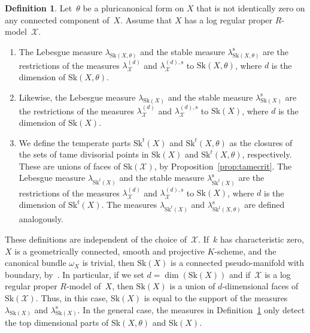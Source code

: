 \documentclass[11pt]{article}
\theoremstyle{definition}
\newtheorem{definition}[equation]{Definition}
\numberwithin{equation}{subsection}
\newcommand{\cX}{\ensuremath{\mathscr{X}}}
\newcommand{\Sk}{\mathrm{Sk}}
\newcommand{\rs}{\mathrm{s}}
\let\form\theta
\let\Leb\lambda
\begin{document}
\begin{definition}\label{defi:skmeasures}
Let~$\form$ be a pluricanonical form on $X$ that is not identically zero on any connected component of~$X$.
Assume that $X$ has a log regular proper $R$\nobreakdash-model~$\cX$.

\begin{enumerate}
\item The Lebesgue measure $\Leb_{\Sk(X,\form)}$ and the stable measure $\Leb^{\rs}_{\Sk(X,\form)}$ are
the restrictions of the measures $\Leb_{\cX}^{(d)}$ and $\Leb^{(d),\rs}_{\cX}$ to $\Sk(X,\form)$, where $d$ is the dimension of $\Sk(X,\form)$.

\item
Likewise, the Lebesgue measure $\Leb_{\Sk(X)}$ and the stable measure $\Leb^{\rs}_{\Sk(X)}$ are
the restrictions of the measures $\Leb_{\cX}^{(d)}$ and $\Leb^{(d),\rs}_{\cX}$ to $\Sk(X)$, where $d$ is the dimension of $\Sk(X)$.

\item We define the temperate parts $\Sk^t(X)$ and $\Sk^t(X,\form)$ as the closures of the sets of tame divisorial points in $\Sk(X)$ and $\Sk^t(X,\form)$, respectively. These are unions of faces of $\Sk(\cX)$, by Proposition~\ref{prop:tamecrit}.
The Lebesgue measure $\Leb_{\Sk^t(X)}$ and the stable measure $\Leb^{\rs}_{\Sk^t(X)}$ are
the restrictions of the measures $\Leb_{\cX}^{(d)}$ and $\Leb^{(d),\rs}_{\cX}$ to $\Sk(X)$, where $d$ is the dimension of $\Sk^t(X)$. The measures $\Leb_{\Sk^t(X)}$ and $\Leb^{\rs}_{\Sk^t(X,\form)}$ are defined analogously.
\end{enumerate}
\end{definition}
These definitions are independent of the choice of~$\cX$.
If~$k$ has characteristic zero, $X$ is a geometrically connected, smooth and projective $K$\nobreakdash-scheme, and the canonical bundle
$\omega_X$ is trivial, then $\Sk(X)$ is a connected pseudo-manifold with boundary, by~\cite[4.2.4]{NiXu}. In particular, if we set $d=\dim(\Sk(X))$ and if~$\cX$ is a log regular proper $R$\nobreakdash-model of~$X$, then $\Sk(X)$ is a union of $d$-dimensional faces of $\Sk(\cX)$. Thus, in this case, $\Sk(X)$ is equal to the support of the measures $\Leb_{\Sk(X)}$ and $\Leb^{\rs}_{\Sk(X)}$. In the general case, the measures in Definition~\ref{defi:skmeasures} only detect the top dimensional parts of $\Sk(X,\form)$ and $\Sk(X)$.
\end{document}
